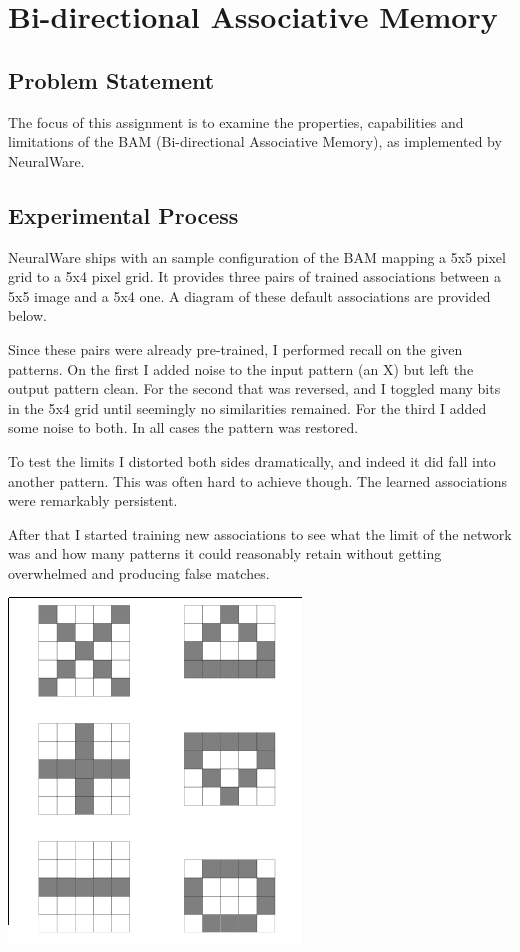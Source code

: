 \documentclass[12pt]{article}
\begin{document}
\maketitle

\section{Bi-directional Associative Memory}

\subsection{Problem Statement}

The focus of this assignment is to examine the properties, capabilities and limitations of the BAM (Bi-directional Associative Memory), as implemented by NeuralWare.  

\subsection{Experimental Process}

NeuralWare ships with an sample configuration of the BAM mapping a 5x5 pixel grid to a 5x4 pixel grid.  It provides three pairs of trained associations between a 5x5 image and a 5x4 one.  A diagram of these default associations are provided below.  

Since these pairs were already pre-trained, I performed recall on the given patterns.  On the first I added noise to the input pattern (an X) but left the output pattern clean.  For the second that was reversed, and I toggled many bits in the 5x4 grid until seemingly no similarities remained.  For the third I added some noise to both.  In all cases the pattern was restored. 

To test the limits I distorted both sides dramatically, and indeed it did fall into another pattern.  This was often hard to achieve though.  The learned associations were remarkably persistent.

After that I started training new associations to see what the limit of the network was and how many patterns it could reasonably retain without getting overwhelmed and producing false matches.  

\begin{center}
\includegraphics[scale=0.3]{default.png}
\end{center}
\end{document}
